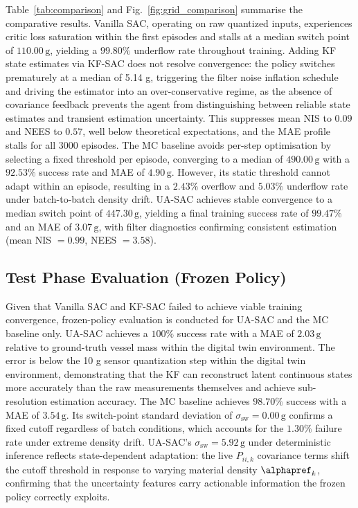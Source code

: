 \documentclass[conference]{IEEEtran}
\begin{document}
Table~\ref{tab:comparison} and
Fig.~\ref{fig:grid_comparison} summarise the
comparative results. Vanilla SAC, operating on raw
quantized inputs, experiences critic loss saturation
within the first episodes and stalls at a median switch
point of $110.00\,\text{g}$, yielding a $99.80\%$
underflow rate throughout training. Adding KF state
estimates via KF-SAC does not resolve convergence: the policy switches prematurely at a median of 5.14 g, triggering the filter noise inflation schedule and driving the estimator into an over-conservative regime, as the absence of covariance feedback prevents the agent from distinguishing between reliable state estimates and transient estimation uncertainty. This suppresses mean NIS to
$0.09$ and NEES to $0.57$, well below theoretical
expectations, and the MAE profile stalls for all 3000
episodes. The MC baseline avoids per-step optimisation
by selecting a fixed threshold per episode, converging
to a median of $490.00\,\text{g}$ with a $92.53\%$
success rate and MAE of $4.90\,\text{g}$. However, its
static threshold cannot adapt within an episode,
resulting in a $2.43\%$ overflow and $5.03\%$
underflow rate under batch-to-batch density drift.
UA-SAC achieves stable convergence to a median switch
point of $447.30\,\text{g}$, yielding a final training 
success rate of $99.47\%$ and an MAE of $3.07\,\text{g}$, 
with filter diagnostics confirming consistent estimation 
(mean NIS $=0.99$, NEES $=3.58$).

\subsection{Test Phase Evaluation (Frozen Policy)}
\label{sec:test}

Given that Vanilla SAC and KF-SAC failed to achieve
viable training convergence, frozen-policy evaluation
is conducted for UA-SAC and the MC baseline only.
UA-SAC achieves a $100\%$ success rate with a MAE of
$2.03\,\text{g}$ relative to ground-truth vessel mass
within the digital twin environment. The error is below the 10 g sensor quantization step within the digital twin environment, demonstrating that the KF can reconstruct latent continuous states more accurately than the raw measurements themselves and achieve sub-resolution estimation accuracy. The MC baseline achieves $98.70\%$ success with
a MAE of $3.54\,\text{g}$. Its switch-point standard
deviation of $\sigma_\text{sw}=0.00\,\text{g}$ confirms
a fixed cutoff regardless of batch conditions, which
accounts for the $1.30\%$ failure rate under extreme
density drift. UA-SAC's $\sigma_\text{sw}=5.92\,
\text{g}$ under deterministic inference reflects
state-dependent adaptation: the live $P_{ii,k}$
covariance terms shift the cutoff threshold in response
to varying material density $\alphapref_k$, confirming that
the uncertainty features carry actionable information
the frozen policy correctly exploits.
\end{document}
